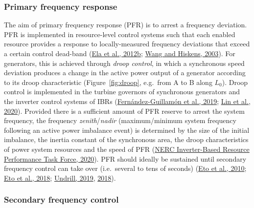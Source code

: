 \documentclass[12pt,a4paper,]{report}
\begin{document}
\hypertarget{sec:lit_review-balancing_practices-pfr}{%
\subsubsection{Primary frequency
response}\label{sec:lit_review-balancing_practices-pfr}}

The aim of primary frequency response (PFR) is to arrest a frequency
deviation. PFR is implemented in resource-level control systems such
that each enabled resource provides a response to locally-measured
frequency deviations that exceed a certain control dead-band
(\protect\hyperlink{ref-elaAlternativeApproachesIncentivizing2012}{Ela
et al., 2012b};
\protect\hyperlink{ref-wangReviewAGCImplementation2003}{Wang and
Hiskens, 2003}). For generators, this is achieved through \emph{droop
control}, in which a synchronous speed deviation produces a change in
the active power output of a generator according to its droop
characteristic (Figure~\ref{fig:droop}, e.g.~from A to B along \(L_0\)).
Droop control is implemented in the turbine governors of synchronous
generators and the inverter control systems of IBRs
(\protect\hyperlink{ref-fernandez-guillamonPowerSystemsHigh2019}{Fernández-Guillamón
et al., 2019};
\protect\hyperlink{ref-linResearchRoadmapGridForming2020}{Lin et al.,
2020}). Provided there is a sufficient amount of PFR reserve to arrest
the system frequency, the frequency \emph{zenith}/\emph{nadir}
(maximum/minimum system frequency following an active power imbalance
event) is determined by the size of the initial imbalance, the inertia
constant of the synchronous area, the droop characteristics of power
system resources and the speed of PFR
(\protect\hyperlink{ref-nercinverter-basedresourceperformancetaskforceFastFrequencyResponse2020}{NERC
Inverter-Based Resource Performance Task Force, 2020}). PFR should
ideally be sustained until secondary frequency control can take over
(i.e.~several to tens of seconds)
(\protect\hyperlink{ref-etoUseFrequencyResponse2010}{Eto et al., 2010};
\protect\hyperlink{ref-etoFrequencyControlRequirements2018}{Eto et al.,
2018}; \protect\hyperlink{ref-undrillNotesFrequencyControl2019}{Undrill,
2019},
\protect\hyperlink{ref-undrillPrimaryFrequencyResponse2018}{2018}).

\hypertarget{secondary-frequency-control}{%
\subsubsection{Secondary frequency
control}\label{secondary-frequency-control}}
\end{document}
